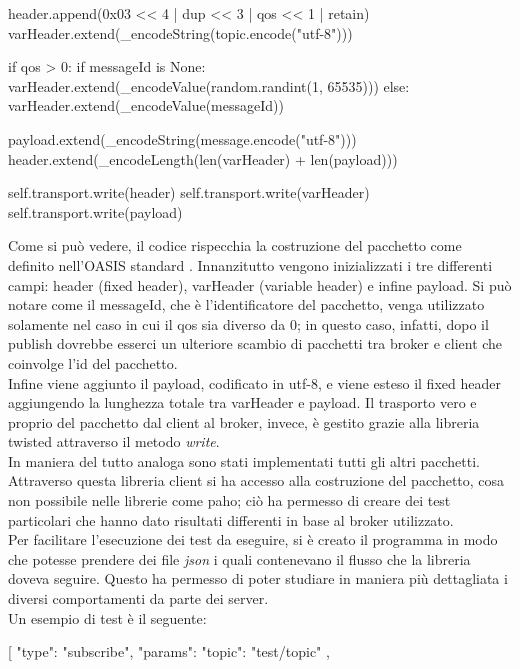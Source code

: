 \documentclass[binding=0.6cm,TFA]{sapthesis}
\begin{document}
\begin{large}
\begin{python}
    header.append(0x03 << 4 | dup << 3 | qos << 1 | retain)
    varHeader.extend(_encodeString(topic.encode("utf-8")))
    
    if qos > 0:
    	if messageId is None:
    		varHeader.extend(_encodeValue(random.randint(1, 65535)))
    	else:
    		varHeader.extend(_encodeValue(messageId))
    
    payload.extend(_encodeString(message.encode("utf-8")))
    header.extend(_encodeLength(len(varHeader) + len(payload)))
    
    self.transport.write(header)
    self.transport.write(varHeader)
    self.transport.write(payload)
\end{python}

Come si può vedere, il codice rispecchia la costruzione del pacchetto come definito nell'OASIS standard \cite{oasis:publish}. Innanzitutto vengono inizializzati i tre differenti campi: header (fixed header), varHeader (variable header) e infine payload. Si può notare come il messageId, che è l'identificatore del pacchetto, venga utilizzato solamente nel caso in cui il qos sia diverso da 0; in questo caso, infatti, dopo il publish dovrebbe esserci un ulteriore scambio di pacchetti tra broker e client che coinvolge l'id del pacchetto. \\
Infine viene aggiunto il payload, codificato in utf-8, e viene esteso il fixed header aggiungendo la lunghezza totale tra varHeader e payload. Il trasporto vero e proprio del pacchetto dal client al broker, invece, è gestito grazie alla libreria twisted attraverso il metodo \textit{write}. \\

In maniera del tutto analoga sono stati implementati tutti gli altri pacchetti. Attraverso questa libreria client si ha accesso alla costruzione del pacchetto, cosa non possibile nelle librerie come paho; ciò ha permesso di creare dei test particolari che hanno dato risultati differenti in base al broker utilizzato. \\

Per facilitare l'esecuzione dei test da eseguire, si è creato il programma in modo che potesse prendere dei file \textit{json} i quali contenevano il flusso che la libreria doveva seguire. Questo ha permesso di poter studiare in maniera più dettagliata i diversi comportamenti da parte dei server. \\
Un esempio di test è il seguente:
\begin{python}
[   
    {
       "type": "subscribe",
       "params": {
           "topic": "test/topic"
       }     
    },


\end{python}
\end{large}
\end{document}

